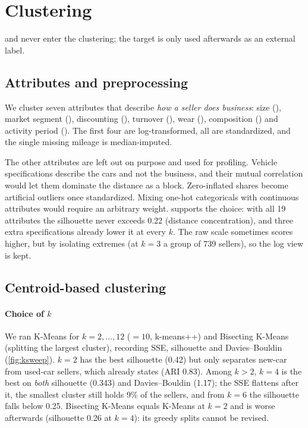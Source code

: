 \section{Clustering}\label{sec:m2}
 and  never enter the clustering; the target is only used afterwards as an external label.

\subsection{Attributes and preprocessing}\label{sec:m2attr}
We cluster seven attributes that describe \emph{how a seller does business}: size (), market segment (), discounting (), turnover (), wear (), composition () and activity period (). The first four are log-transformed, all are standardized, and the single missing mileage is median-imputed.

The other attributes are left out on purpose and used for profiling. Vehicle specifications describe the cars and not the business, and their mutual correlation would let them dominate the distance as a block. Zero-inflated shares become artificial outliers once standardized. Mixing one-hot categoricals with continuous attributes would require an arbitrary weight.  supports the choice: with all 19 attributes the silhouette never exceeds 0.22 (distance concentration), and three extra specifications already lower it at every $k$. The raw scale sometimes scores higher, but by isolating extremes (at $k=3$ a group of 739 sellers), so the log view is kept.

\begin{table}[t]
\centering
\caption{K-Means silhouette by attribute set and scale (min$_4$: smallest cluster at $k=4$). The row used is the first one.}\label{tab:sens}
\end{table}

\subsection{Centroid-based clustering}\label{sec:kmeans}
\paragraph{Choice of $k$} We ran K-Means for $k=2,\dots,12$ ($=10$, k-means++) and Bisecting K-Means (splitting the largest cluster), recording SSE, silhouette and Davies--Bouldin (\cref{fig:ksweep}). $k=2$ has the best silhouette (0.42) but only separates new-car from used-car sellers, which  already states (ARI 0.83). Among $k>2$, $k=4$ is the best on \emph{both} silhouette (0.343) and Davies--Bouldin (1.17); the SSE flattens after it, the smallest cluster still holds 9\% of the sellers, and from $k=6$ the silhouette falls below 0.25. Bisecting K-Means equals K-Means at $k=2$ and is worse afterwards (silhouette 0.26 at $k=4$): its greedy splits cannot be revised.

